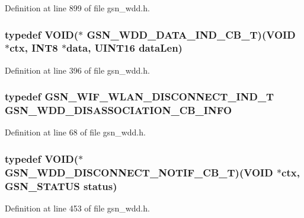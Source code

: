 Definition at line 899 of file gsn\_\-wdd.h.

\hypertarget{a00603_a6ba5be1c4251a77b2a642319af4b696b}{
\subsubsection[{GSN\_\-WDD\_\-DATA\_\-IND\_\-CB\_\-T}]{\setlength{\rightskip}{0pt plus 5cm}typedef VOID($\ast$ {\bf GSN\_\-WDD\_\-DATA\_\-IND\_\-CB\_\-T})(VOID $\ast$ctx, {\bf INT8} $\ast$data, {\bf UINT16} dataLen)}}
\label{a00603_a6ba5be1c4251a77b2a642319af4b696b}


Definition at line 396 of file gsn\_\-wdd.h.

\hypertarget{a00603_a862addfd6eccb0fedeaaa04732f94d5b}{
\subsubsection[{GSN\_\-WDD\_\-DISASSOCIATION\_\-CB\_\-INFO}]{\setlength{\rightskip}{0pt plus 5cm}typedef {\bf GSN\_\-WIF\_\-WLAN\_\-DISCONNECT\_\-IND\_\-T} {\bf GSN\_\-WDD\_\-DISASSOCIATION\_\-CB\_\-INFO}}}
\label{a00603_a862addfd6eccb0fedeaaa04732f94d5b}


Definition at line 68 of file gsn\_\-wdd.h.

\hypertarget{a00603_ac5fbb773daa449d33e065683260e253d}{
\subsubsection[{GSN\_\-WDD\_\-DISCONNECT\_\-NOTIF\_\-CB\_\-T}]{\setlength{\rightskip}{0pt plus 5cm}typedef VOID($\ast$ {\bf GSN\_\-WDD\_\-DISCONNECT\_\-NOTIF\_\-CB\_\-T})(VOID $\ast$ctx, {\bf GSN\_\-STATUS} status)}}
\label{a00603_ac5fbb773daa449d33e065683260e253d}


Definition at line 453 of file gsn\_\-wdd.h.

